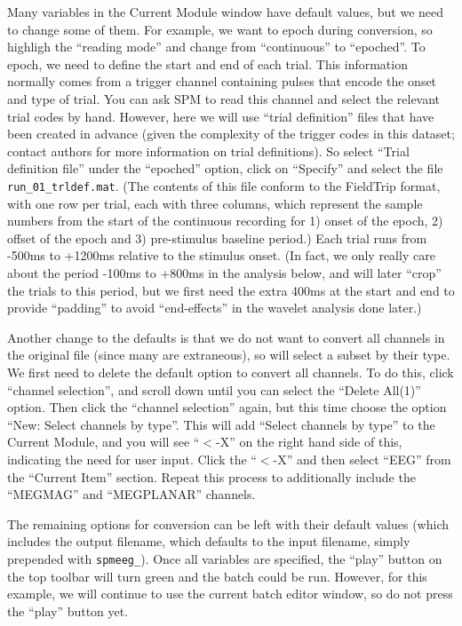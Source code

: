 Many variables in the Current Module window have default values, but we need to change some of them. For example, we want to epoch during conversion, so highligh the ``reading mode'' and change from ``continuous'' to ``epoched''. To epoch, we need to define the start and end of each trial. This information normally comes from a trigger channel containing pulses that encode the onset and type of trial. You can ask SPM to read this channel and select the relevant trial codes by hand. However, here we will use ``trial definition'' files that have been created in advance (given the complexity of the trigger codes in this dataset; contact authors for more information on trial definitions). So select ``Trial definition file'' under the ``epoched'' option, click on ``Specify'' and select the file \texttt{run\_01\_trldef.mat}. (The contents of this file conform to the FieldTrip format, with one row per trial, each with three columns, which represent the sample numbers from the start of the continuous recording for 1) onset of the epoch, 2) offset of the epoch and 3) pre-stimulus baseline period.) Each trial runs from -500ms to +1200ms relative to the stimulus onset. (In fact, we only really care about the period -100ms to +800ms in the analysis below, and will later ``crop'' the trials to this period, but we first need the extra 400ms at the start and end to provide ``padding'' to avoid ``end-effects'' in the wavelet analysis done later.)

Another change to the defaults is that we do not want to convert all channels in the original file (since many are extraneous), so will select a subset by their type. We first need to delete the default option to convert all channels. To do this, click ``channel selection'', and  scroll down until you can select the ``Delete All(1)'' option. Then click the ``channel selection'' again, but this time choose the option ``New: Select channels by type''. This will add ``Select channels by type'' to the Current Module, and you will see ``\(<\)-X'' on the right hand side of this, indicating the need for user input. Click the ``\(<\)-X'' and then select ``EEG'' from the ``Current Item'' section. Repeat this process to additionally include the ``MEGMAG'' and ``MEGPLANAR'' channels.

The remaining options for conversion can be left with their default values (which includes the output filename, which defaults to the input filename, simply prepended with \texttt{spmeeg\_}). Once all variables are specified, the ``play'' button on the top toolbar will turn green and the batch could be run. However, for this example, we will continue to use the current batch editor window, so do not press the ``play'' button yet.

